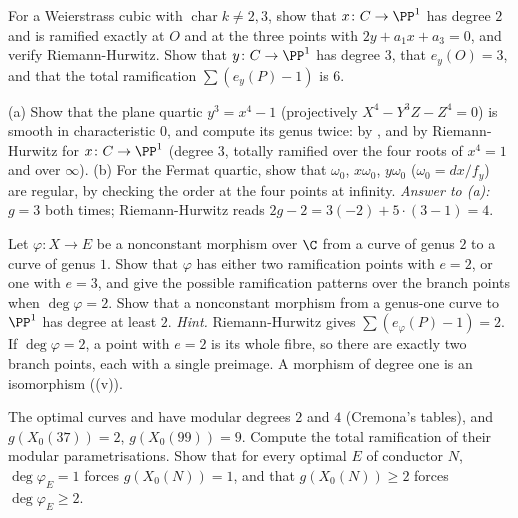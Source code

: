 \begin{exercise}\label{ex:curves:ex-xy}
For a Weierstrass cubic with $\operatorname{char}k\ne2,3$, show that $x\colon C\to\PP^1$ has degree $2$ and is ramified exactly at $O$ and at the three points with $2y+a_1x+a_3=0$, and verify
Riemann-Hurwitz. Show that $y\colon C\to\PP^1$ has degree $3$, that $e_y(O)=3$, and that the total ramification $\sum(e_y(P)-1)$ is $6$.
\end{exercise}

\begin{exercise}\label{ex:curves:ex-quartic}
(a) Show that the plane quartic $y^3=x^4-1$ (projectively $X^4-Y^3Z-Z^4=0$) is smooth in characteristic $0$, and compute its genus twice: by , and by
Riemann-Hurwitz for $x\colon C\to\PP^1$ (degree $3$, totally ramified over the four roots of $x^4=1$ and over $\infty$). (b) For the Fermat quartic, show that $\omega_0$, $x\omega_0$, $y\omega_0$
($\omega_0=dx/f_y$) are regular, by checking the order at the four points at infinity. \emph{Answer to (a):} $g=3$ both times; Riemann-Hurwitz reads
$2g-2=3(-2)+5\cdot(3-1)=4$.
\end{exercise}

\begin{exercise}\label{ex:curves:ex-genus2}
Let $\varphi\colon X\to E$ be a nonconstant morphism over $\C$ from a curve of genus $2$ to a curve of genus $1$. Show that $\varphi$ has either two ramification points with $e=2$, or one with $e=3$,
and give the possible ramification patterns over the branch points when $\deg\varphi=2$. Show that a nonconstant morphism from a genus-one curve to $\PP^1$ has degree at least $2$.
\emph{Hint.} Riemann-Hurwitz gives $\sum(e_\varphi(P)-1)=2$. If $\deg\varphi=2$, a point with $e=2$ is its whole fibre, so there are exactly two branch points, each
with a single preimage. A morphism of degree one is an isomorphism ((v)).
\end{exercise}

\begin{exercise}\label{ex:curves:ex-degrees}
The optimal curves  and  have modular degrees $2$ and $4$ (Cremona's tables), and $g(X_0(37))=2$, $g(X_0(99))=9$. Compute the total ramification of their modular
parametrisations. Show that for every optimal $E$ of conductor $N$, $\deg\varphi_E=1$ forces $g(X_0(N))=1$, and that $g(X_0(N))\ge2$ forces $\deg\varphi_E\ge2$.
\end{exercise}

